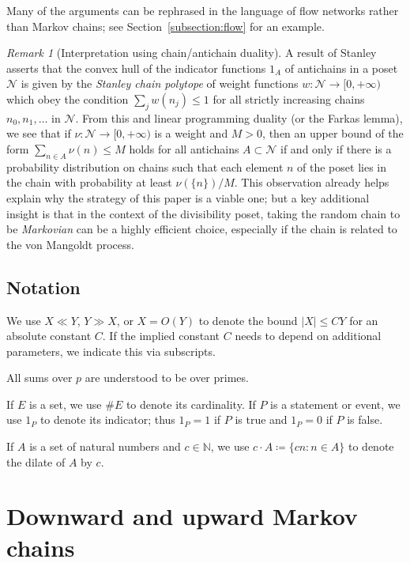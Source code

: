 \documentclass[12pt]{amsart}
\theoremstyle{definition}
\theoremstyle{remark}
\newtheorem{remark}[theorem]{Remark}
\numberwithin{equation}{section}
\newcommand{\N}{{\mathbb N}}
\newcommand{\1}{{\mathbf 1}}
\begin{document}
Many of the arguments can be rephrased in the language of flow networks rather than Markov chains; see Section~\ref{subsection:flow} for an example.


\begin{remark}[Interpretation using chain/antichain duality] A result of Stanley \cite{stanley} asserts that the convex hull of the indicator functions $1_A$ of antichains in a poset ${\mathcal N}$ is given by the \emph{Stanley chain polytope} of weight functions $w \colon {\mathcal N} \to [0,+\infty)$ which obey the condition $\sum_j w(n_j) \leq 1$ for all strictly increasing chains $n_0, n_1, \dots$ in ${\mathcal N}$.  From this and linear programming duality (or the Farkas lemma), we see that if $\nu \colon {\mathcal N} \to [0,+\infty)$ is a weight and $M>0$, then an upper bound of the form $\sum_{n \in A} \nu(n) \leq M$ holds for all antichains $A \subset {\mathcal N}$ if and only if there is a probability distribution on chains such that each element $n$ of the poset lies in the chain with probability at least $\nu(\{n\})/M$.  This observation already helps explain why the strategy of this paper is a viable one; but a key additional insight is that in the context of the divisibility poset, taking the random chain to be \emph{Markovian} can be a highly efficient choice, especially if the chain is related to the von Mangoldt process. 
\end{remark}

\subsection{Notation}

We use $X \ll Y$, $Y \gg X$, or $X = O(Y)$ to denote the bound $|X| \leq CY$ for an absolute constant $C$. If the implied constant $C$ needs to depend on additional parameters, we indicate this via subscripts.

All sums over $p$ are understood to be over primes.  

If $E$ is a set, we use $\# E$ to denote its cardinality.  If $P$ is a statement or event, we use $1_P$ to denote its indicator; thus $1_P=1$ if $P$ is true and $1_P=0$ if $P$ is false.

If $A$ is a set of natural numbers and $c \in \N$, we use $c \cdot A \coloneq \{ c n: n \in A \}$ to denote the dilate of $A$ by $c$.

\section{Downward and upward Markov chains}
\end{document}
